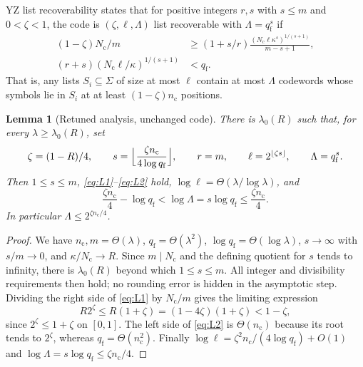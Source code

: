 \documentclass[11pt]{article}
\newtheorem{lemma}[theorem]{Lemma}
\theoremstyle{definition}\newtheorem{definition}[theorem]{Definition}
\theoremstyle{remark}\newtheorem{remark}[theorem]{Remark}
\begin{document}
YZ list recoverability \cite[Lemma~4.3, equations~(8)--(9)]{YZ24} states that for positive integers \(r,s\) with \(s\le m\) and \(0<\zeta<1\), the code is \((\zeta,\ell,\Lambda)\) list recoverable with \(\Lambda=q_{\mathrm f}^s\) if
\begin{align}
 (1-\zeta)N_{\mathrm c}/m&\ge(1+s/r)\frac{(N_{\mathrm c}\ell\kappa^s)^{1/(s+1)}}{m-s+1},\tag{L1}\label{eq:L1}\\
 (r+s)(N_{\mathrm c}\ell/\kappa)^{1/(s+1)}&<q_{\mathrm f}.\tag{L2}\label{eq:L2}
\end{align}
That is, any lists \(S_i\subseteq\Sigma\) of size at most \(\ell\) contain at most \(\Lambda\) codewords whose symbols lie in \(S_i\) at at least \((1-\zeta)n_{\mathrm c}\) positions.

\begin{lemma}[Retuned analysis, unchanged code]\label{lem:retune}
There is \(\lambda_0(R)\) such that, for every \(\lambda\ge\lambda_0(R)\), set
\[
 \zeta=(1-R)/4,\qquad s=\Bigl\lfloor\frac{\zeta n_{\mathrm c}}{4\log q_{\mathrm f}}\Bigr\rfloor,\qquad r=m,\qquad\ell=2^{\lfloor\zeta s\rfloor},\qquad\Lambda=q_{\mathrm f}^s.
\]
Then \(1\le s\le m\), \eqref{eq:L1}--\eqref{eq:L2} hold, \(\log\ell=\Theta(\lambda/\log\lambda)\), and
\[
 \frac{\zeta n_{\mathrm c}}4-\log q_{\mathrm f}<\log\Lambda=s\log q_{\mathrm f}\le\frac{\zeta n_{\mathrm c}}4.
\]
In particular \(\Lambda\le2^{\zeta n_{\mathrm c}/4}\).
\end{lemma}
\begin{proof}
We have \(n_{\mathrm c},m=\Theta(\lambda)\), \(q_{\mathrm f}=\Theta(\lambda^2)\), \(\log q_{\mathrm f}=\Theta(\log\lambda)\), \(s\to\infty\) with \(s/m\to0\), and \(\kappa/N_{\mathrm c}\to R\). Since \(m\mid N_{\mathrm c}\) and the defining quotient for \(s\) tends to infinity, there is \(\lambda_0(R)\) beyond which \(1\le s\le m\). All integer and divisibility requirements then hold; no rounding error is hidden in the asymptotic step. Dividing the right side of \eqref{eq:L1} by \(N_{\mathrm c}/m\) gives the limiting expression
\[
 R2^\zeta\le R(1+\zeta)=(1-4\zeta)(1+\zeta)<1-\zeta,
\]
since \(2^\zeta\le1+\zeta\) on \([0,1]\). The left side of \eqref{eq:L2} is \(\Theta(n_{\mathrm c})\) because its root tends to \(2^\zeta\), whereas \(q_{\mathrm f}=\Theta(n_{\mathrm c}^2)\). Finally \(\log\ell=\zeta^2n_{\mathrm c}/(4\log q_{\mathrm f})+O(1)\) and \(\log\Lambda=s\log q_{\mathrm f}\le\zeta n_{\mathrm c}/4\).
\end{proof}
\end{document}
